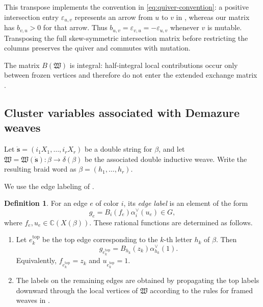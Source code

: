 \documentclass[12pt, reqno]{amsart}
\theoremstyle{plain}
\theoremstyle{definition}
\newtheorem{definition}[theorem]{Definition}
\numberwithin{equation}{section}
\begin{document}
This transpose implements the convention in
\eqref{eq:quiver-convention}: a positive intersection entry
\(\varepsilon_{u,v}\) represents an arrow from \(u\) to \(v\)
in \cite{casals2025cluster}, whereas our matrix has
\(b_{v,u}>0\) for that arrow. Thus
\(b_{u,v}=\varepsilon_{v,u}=-\varepsilon_{u,v}\) whenever
\(v\) is mutable. Transposing the full skew-symmetric intersection
matrix before restricting the columns preserves the quiver and
commutes with mutation.

The matrix \(B(\mathfrak W)\) is integral: half-integral local
contributions occur only between frozen vertices and therefore do not
enter the extended exchange matrix
\cite[Remark~4.27]{casals2025cluster}.


\subsection{Cluster variables associated with Demazure weaves}

Let
\(\ddot{\mathbf{s}}=(i_1X_1,\ldots,i_rX_r)\) be a double string for
\(\beta\), and let
\(\mathfrak W=\mathfrak W(\ddot{\mathbf{s}})
\colon\beta\to\delta(\beta)\) be the associated double inductive
weave. Write the resulting braid word as
\(\beta=(h_1,\ldots,h_r)\).

We use the edge labeling of
\cite[Definition~4.2]{casals2025comparing}.

\begin{definition}\label{def:edge-labeling}
For an edge \(e\) of color \(i\), its \emph{edge label} is an element
of the form
\[
    g_e
    =
    B_i(f_e)\alpha_i^\vee(u_e)
    \in G,
\]
where \(f_e,u_e\in\mathbb{C}(X(\beta))\). These rational functions are
determined as follows.

\begin{enumerate}
    \item[(i)]
    Let \(e_k^{\mathrm{top}}\) be the top edge corresponding to the
    \(k\)-th letter \(h_k\) of \(\beta\). Then
    \[
        g_{e_k^{\mathrm{top}}}
        =
        B_{h_k}(z_k)\alpha_{h_k}^\vee(1).
    \]
    Equivalently,
    \(f_{e_k^{\mathrm{top}}}=z_k\) and
    \(u_{e_k^{\mathrm{top}}}=1\).

    \item[(ii)]
    The labels on the remaining edges are obtained by propagating the
    top labels downward through the local vertices of \(\mathfrak W\)
    according to the rules for framed weaves in
    \cite[Definition~5.8]{casals2025cluster}.
\end{enumerate}
\end{definition}
\end{document}
